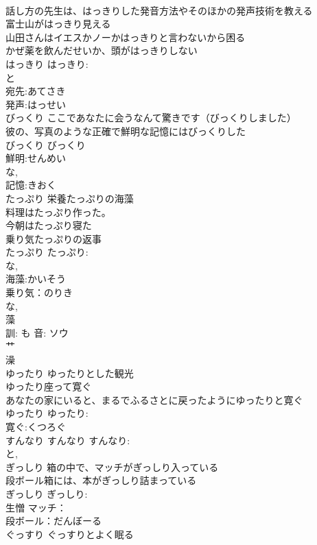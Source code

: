 \documentclass[8pt]{extreport}
\begin{document}
\begin{CJK}{UTF8}{min}
\\	話し方の先生は、はっきりした発音方法やそのほかの発声技術を教える 
\\	富士山がはっきり見える 
\\	山田さんはイエスかノーかはっきりと言わないから困る 
\\	かぜ薬を飲んだせいか、頭がはっきりしない 
\\	はっきり			はっきり:
\\	と 
\\	宛先:あてさき
\\	発声:はっせい
\\	びっくり	ここであなたに会うなんて驚きです（びっくりしました） 
\\	彼の、写真のような正確で鮮明な記憶にはびっくりした 
\\	びっくり			びっくり
\\	鮮明:せんめい
\\	な, 
\\	記憶:きおく
\\	たっぷり	栄養たっぷりの海藻 
\\	料理はたっぷり作った。 
\\	今朝はたっぷり寝た 
\\	乗り気たっぷりの返事 
\\	たっぷり			たっぷり:
\\	な, 
\\	海藻:かいそう
\\	乗り気：のりき
\\	な, 
\\	藻 
\\	訓: も 音: ソウ 
\\	艹 
\\	澡 
\\	ゆったり	ゆったりとした観光 
\\	ゆったり座って寛ぐ 
\\	あなたの家にいると、まるでふるさとに戻ったようにゆったりと寛ぐ 
\\	ゆったり			ゆったり:
\\	寛ぐ:くつろぐ
\\	すんなり		すんなり			すんなり:
\\	と, 
\\	ぎっしり	箱の中で、マッチがぎっしり入っている 
\\	段ボール箱には、本がぎっしり詰まっている 
\\	ぎっしり			ぎっしり:
\\	生憎 マッチ：
\\	段ボール：だんぼーる
\\	ぐっすり	ぐっすりとよく眠る 

\end{CJK}
\end{document}
